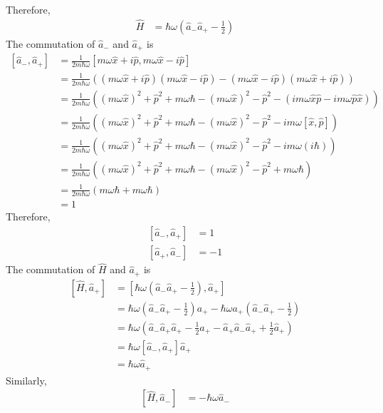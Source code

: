 \documentclass[titlepage, fleqn, a4paper, 12pt, twoside]{article}
\theoremstyle{definition}
\theoremstyle{theorem}
\begin{document}
Therefore,
\begin{align*}
	\hat{H} &= \hbar \omega \left( \hat{a}_- \hat{a}_+ - \frac{1}{2} \right)
\end{align*}
The commutation of $\hat{a}_-$ and $\hat{a}_+$ is
\begin{align*}
	\left[ \hat{a}_- , \hat{a}_+ \right] &= \frac{1}{2 m \hbar \omega} \left[ m \omega \hat{x} + i \hat{p} , m \omega \hat{x} - i \hat{p} \right]\\
	&= \frac{1}{2 m \hbar \omega} \left( \left( m \omega \hat{x} + i \hat{p} \right) \left( m \omega \hat{x} - i \hat{p} \right) - \left( m \omega \hat{x} - i \hat{p} \right) \left( m \omega \hat{x} + i \hat{p} \right) \right)\\
	&= \frac{1}{2 m \hbar \omega} \left( \left( m \omega \hat{x} \right)^2 + \hat{p}^2 + m \omega \hbar - \left( m \omega \hat{x} \right)^2 - \hat{p}^2 - \left( i m \omega \hat{x} \hat{p} - i m \omega \hat{p} \hat{x} \right) \right)\\
	&= \frac{1}{2 m \hbar \omega} \left( \left( m \omega \hat{x} \right)^2 + \hat{p}^2 + m \omega \hbar - \left( m \omega \hat{x} \right)^2 - \hat{p}^2 - i m \omega \left[ \hat{x} , \hat{p} \right] \right)\\
	&= \frac{1}{2 m \hbar \omega} \left( \left( m \omega \hat{x} \right)^2 + \hat{p}^2 + m \omega \hbar - \left( m \omega \hat{x} \right)^2 - \hat{p}^2 - i m \omega (i \hbar) \right)\\
	&= \frac{1}{2 m \hbar \omega} \left( \left( m \omega \hat{x} \right)^2 + \hat{p}^2 + m \omega \hbar - \left( m \omega \hat{x} \right)^2 - \hat{p}^2 + m \omega \hbar \right)\\
	&= \frac{1}{2 m \hbar \omega} \left( m \omega \hbar + m \omega \hbar \right)\\
	&= 1
\end{align*}
Therefore,
\begin{align*}
	\left[ \hat{a}_- , \hat{a}_+ \right] &= 1\\
	\left[ \hat{a}_+ , \hat{a}_- \right] &= -1
\end{align*}
The commutation of $\hat{H}$ and $\hat{a}_+$ is
\begin{align*}
	\left[ \hat{H} , \hat{a}_+ \right] &= \left[ \hbar \omega \left( \hat{a}_- \hat{a}_+ - \frac{1}{2} \right) , \hat{a}_+ \right]\\
	&= \hbar \omega \left( \hat{a}_- \hat{a}_+ - \frac{1}{2} \right) a_+ - \hbar \omega a_+ \left( \hat{a}_- \hat{a}_+ - \frac{1}{2} \right)\\
	&= \hbar \omega \left( \hat{a}_- \hat{a}_+ \hat{a}_+ - \frac{1}{2} \hat{a}_+ - \hat{a}_+ \hat{a}_- \hat{a}_+ + \frac{1}{2} \hat{a}_+ \right)\\
	&= \hbar \omega \left[ \hat{a}_- , \hat{a}_+ \right] \hat{a}_+\\
	&= \hbar \omega \hat{a}_+
\end{align*}
Similarly,
\begin{align*}
	\left[ \hat{H} , \hat{a}_- \right] &= -\hbar \omega \hat{a}_-
\end{align*}
\end{document}
